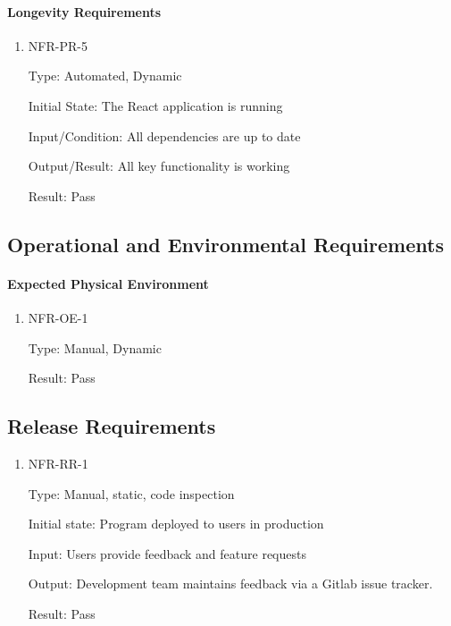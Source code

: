\documentclass[12pt, titlepage]{article}
\begin{document}
\paragraph{Longevity Requirements}

\begin{enumerate}

\item{NFR-PR-5\\}

Type: Automated, Dynamic 

Initial State: The React application is running 

Input/Condition: All dependencies are up to date 

Output/Result: All key functionality is working 

Result: Pass

\end{enumerate}

\subsection{Operational and Environmental Requirements}

\paragraph{Expected Physical Environment}

\begin{enumerate}

\item{NFR-OE-1\\}

Type: Manual, Dynamic 

Result: Pass

\end{enumerate}

\subsection{Release Requirements}

\begin{enumerate}

\item{NFR-RR-1\\}

Type: Manual, static, code inspection 

Initial state: Program deployed to users in production 

Input: Users provide feedback and feature requests 

Output: Development team maintains feedback via a Gitlab issue tracker. 

Result: Pass

\end{enumerate}
\end{document}
